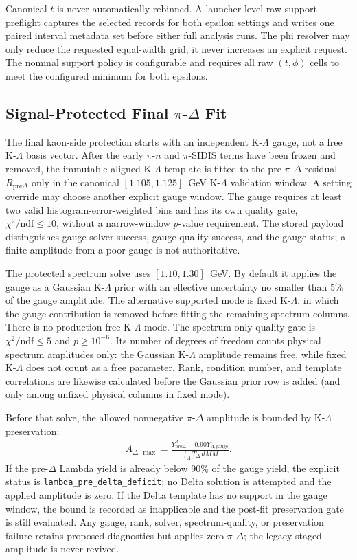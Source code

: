 \documentclass[11pt]{article}
\begin{document}
Canonical $t$ is never automatically rebinned.  A launcher-level raw-support
preflight captures the selected records for both epsilon settings and writes
one paired interval metadata set before either full analysis runs.  The phi
resolver may only reduce the requested equal-width grid; it never increases an
explicit request.  The nominal support policy is configurable and requires all
raw $(t,\phi)$ cells to meet the configured minimum for both epsilons.

\subsection{Signal-Protected Final $\pi$-$\Delta$ Fit}

The final kaon-side protection starts with an independent K-$\Lambda$ gauge,
not a free K-$\Lambda$ basis vector.  After the early $\pi$-$n$ and
$\pi$-SIDIS terms have been frozen and removed, the immutable aligned
K-$\Lambda$ template is fitted to the pre-$\pi$-$\Delta$ residual
$R_{\mathrm{pre}\Delta}$ only in the canonical $[1.105,1.125]$~GeV
K-$\Lambda$ validation window.  A setting override may choose another
explicit gauge window.  The gauge requires at least two valid
histogram-error-weighted bins and has its own quality gate,
$\chi^2/\mathrm{ndf}\leq10$, without a narrow-window $p$-value requirement.
The stored payload distinguishes gauge solver success, gauge-quality success,
and the gauge status; a finite amplitude from a poor gauge is not authoritative.

The protected spectrum solve uses $[1.10,1.30]$~GeV.  By default it applies
the gauge as a Gaussian K-$\Lambda$ prior with an effective uncertainty no
smaller than $5\%$ of the gauge amplitude.  The alternative supported mode is
fixed K-$\Lambda$, in which the gauge contribution is removed before fitting
the remaining spectrum columns.  There is no production free-K-$\Lambda$
mode.  The spectrum-only quality gate is
$\chi^2/\mathrm{ndf}\leq5$ and $p\geq10^{-6}$.  Its number of degrees of
freedom counts physical spectrum amplitudes only: the Gaussian K-$\Lambda$
amplitude remains free, while fixed K-$\Lambda$ does not count as a free
parameter.  Rank, condition number, and template correlations are likewise
calculated before the Gaussian prior row is added (and only among unfixed
physical columns in fixed mode).

Before that solve, the allowed nonnegative $\pi$-$\Delta$ amplitude is bounded
by K-$\Lambda$ preservation:
\begin{align}
  A_{\Delta,\max}=
  \frac{Y_{\mathrm{pre}\Delta}^{\Lambda}
   -0.90Y_{\Lambda,\mathrm{gauge}}}
       {\int_{\Lambda}T_\Delta\,dMM}.
\end{align}
If the pre-$\Delta$ Lambda yield is already below $90\%$ of the gauge yield,
the explicit status is \texttt{lambda\_pre\_delta\_deficit}; no Delta solution
is attempted and the applied amplitude is zero.  If the Delta template has no
support in the gauge window, the bound is recorded as inapplicable and the
post-fit preservation gate is still evaluated.  Any gauge, rank, solver,
spectrum-quality, or preservation failure retains proposed diagnostics but
applies zero $\pi$-$\Delta$; the legacy staged amplitude is never revived.
\end{document}
